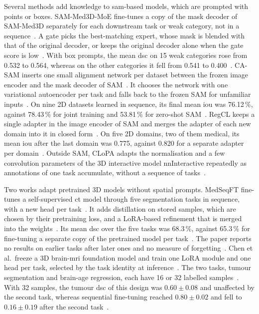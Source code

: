Several methods add knowledge to \gls{sam}-based models, which are prompted with points or boxes.
SAM-Med3D-MoE fine-tunes a copy of the mask decoder of SAM-Med3D separately for each downstream task or weak category, not in a sequence~\cite{wang2024sammed3dmoe}.
A gate picks the best-matching expert, whose mask is blended with that of the original decoder, or keeps the original decoder alone when the gate score is low~\cite{wang2024sammed3dmoe}.
With box prompts, the mean \gls{dsc} on 15 weak categories rose from 0.532 to 0.564, whereas on the other categories it fell from 0.541 to 0.400~\cite{wang2024sammed3dmoe}.
CA-SAM inserts one small alignment network per dataset between the frozen image encoder and the mask decoder of SAM~\cite{wang2025casam}.
It chooses the network with one variational autoencoder per task and falls back to the frozen SAM for unfamiliar inputs~\cite{wang2025casam}.
On nine 2D datasets learned in sequence, its final mean \gls{iou} was 76.12\,\%, against 78.43\,\% for joint training and 53.81\,\% for zero-shot SAM~\cite{wang2025casam}.
RegCL keeps a single adapter in the image encoder of SAM and merges the adapter of each new domain into it in closed form~\cite{shu2025regcl}.
On five 2D domains, two of them medical, its mean \gls{iou} after the last domain was 0.775, against 0.820 for a separate adapter per domain~\cite{shu2025regcl}.
Outside SAM, CLoPA adapts the normalisation and a few convolution parameters of the 3D interactive model nnInteractive repeatedly as annotations of one task accumulate, without a sequence of tasks~\cite{esmaeili2026clopa}.

Two works adapt pretrained 3D models without spatial prompts.
MedSeqFT fine-tunes a self-supervised \gls{ct} model through five segmentation tasks in sequence, with a new head per task~\cite{ye2025medseqft}.
It adds distillation on stored samples, which are chosen by their pretraining loss, and a LoRA-based refinement that is merged into the weights~\cite{ye2025medseqft}.
Its mean \gls{dsc} over the five tasks was 68.3\,\%, against 65.3\,\% for fine-tuning a separate copy of the pretrained model per task~\cite{ye2025medseqft}.
The paper reports no results on earlier tasks after later ones and no measure of forgetting~\cite{ye2025medseqft}.
Chen et al.\ freeze a 3D brain-\gls{mri} foundation model and train one LoRA module and one head per task, selected by the task identity at inference~\cite{chen2026fewshotcontinuallearning3d}.
The two tasks, tumour segmentation and brain-age regression, each have 16 or 32 labelled samples~\cite{chen2026fewshotcontinuallearning3d}.
With 32 samples, the tumour \gls{dsc} of this design was $0.60 \pm 0.08$ and unaffected by the second task, whereas sequential fine-tuning reached $0.80 \pm 0.02$ and fell to $0.16 \pm 0.19$ after the second task~\cite{chen2026fewshotcontinuallearning3d}.

